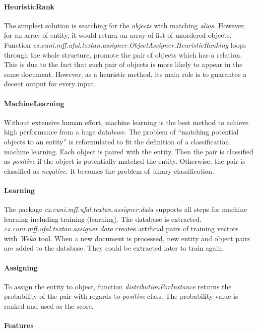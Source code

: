 \paragraph{HeuristicRank}
The simplest solution is searching for the \textit{objects} with matching 
\textit{alias}. However, for an array of entity, it would return an array of 
list of unordered objects. Function
\emph{cz.\-cuni.\-mff.\-ufal.\-textan.\-assigner.\-ObjectAssigner.\-HeuristicRanking}
loops through the whole structure, promote the pair of objects which has a
relation. This is due to the fact that such pair of objects is more likely to
appear in the same document. However, as a heuristic method, its main role is to
guarantee a decent output for every input.

\paragraph{MachineLearning}
Without extensive human effort, machine learning is the best method to achieve
high performance from a huge database. The problem of ``matching potential
objects to an entity'' is reformulated to fit the definition of a classification
machine learning. Each object is paired with the entity. Then the pair is
classified as \emph{positive} if the object is potentially matched the entity.
Otherwise, the pair is classified as \emph{negative}. It becomes the
problem of binary classification.


\paragraph{Learning}
The package \emph{cz.\-cuni.\-mff.\-ufal.\-textan.\-assigner.\-data} supports all steps for
machine learning including training (learning). The database is extracted. 
\emph{cz.\-cuni.\-mff.\-ufal.\-textan.\-assigner.\-data} creates artificial pairs of
training vectors with \textit{Weka} tool. When a new document is processed,
new entity and object pairs are added to the database. They could be extracted
later to train again.

\paragraph{Assigning}
To assign the entity to object, function \emph{distributionForInstance} returns
the probability of the pair with regards to \emph{positive} class. The
probability value is ranked and used as the score.

\paragraph{Features}

